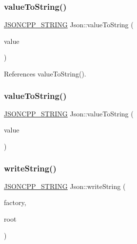 \mbox{\label{namespaceJson_a3cf0c8dbbdb898c4a6fad54670b34bd1_a3cf0c8dbbdb898c4a6fad54670b34bd1}} 
\subsubsection{\texorpdfstring{value\+To\+String()}{valueToString()}\hspace{0.1cm}{\footnotesize\ttfamily [5/6]}}
{\footnotesize\ttfamily \hyperlink{json_8h_a1e723f95759de062585bc4a8fd3fa4be_a1e723f95759de062585bc4a8fd3fa4be}{J\+S\+O\+N\+C\+P\+P\+\_\+\+S\+T\+R\+I\+NG} Json\+::value\+To\+String (\begin{DoxyParamCaption}\item[{double}]{value }\end{DoxyParamCaption})}



References value\+To\+String().

\mbox{\label{namespaceJson_a0a706a1fffba4fe8a8c1ef75b2dbbfab_a0a706a1fffba4fe8a8c1ef75b2dbbfab}} 
\subsubsection{\texorpdfstring{value\+To\+String()}{valueToString()}\hspace{0.1cm}{\footnotesize\ttfamily [6/6]}}
{\footnotesize\ttfamily \hyperlink{json_8h_a1e723f95759de062585bc4a8fd3fa4be_a1e723f95759de062585bc4a8fd3fa4be}{J\+S\+O\+N\+C\+P\+P\+\_\+\+S\+T\+R\+I\+NG} Json\+::value\+To\+String (\begin{DoxyParamCaption}\item[{bool}]{value }\end{DoxyParamCaption})}

\mbox{\label{namespaceJson_a00820c0084189e2a7533531c0f250e3f_a00820c0084189e2a7533531c0f250e3f}} 
\subsubsection{\texorpdfstring{write\+String()}{writeString()}}
{\footnotesize\ttfamily \hyperlink{json_8h_a1e723f95759de062585bc4a8fd3fa4be_a1e723f95759de062585bc4a8fd3fa4be}{J\+S\+O\+N\+C\+P\+P\+\_\+\+S\+T\+R\+I\+NG} Json\+::write\+String (\begin{DoxyParamCaption}\item[{\hyperlink{classJson_1_1StreamWriter_1_1Factory}{Stream\+Writer\+::\+Factory} const \&}]{factory,  }\item[{\hyperlink{classJson_1_1Value}{Value} const \&}]{root }\end{DoxyParamCaption})}




